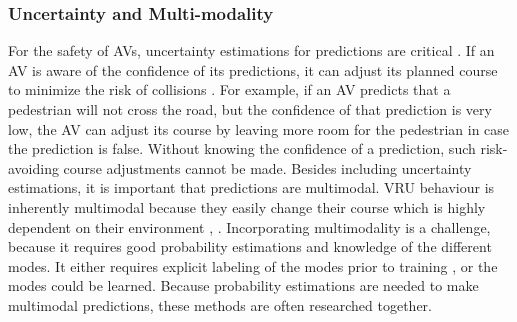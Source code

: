 \subsubsection{Uncertainty and Multi-modality}
For the safety of AVs, uncertainty estimations for predictions are critical \cite{djuric2020uncertainty}. If an AV is aware of the confidence of its predictions, it can adjust its planned course to minimize the risk of collisions \cite{huang2019uncertainty}. For example, if an AV predicts that a pedestrian will not cross the road, but the confidence of that prediction is very low, the AV can adjust its course by leaving more room for the pedestrian in case the prediction is false. Without knowing the confidence of a prediction, such risk-avoiding course adjustments cannot be made. Besides including uncertainty estimations, it is important that predictions are multimodal. VRU behaviour is inherently multimodal because they easily change their course which is highly dependent on their environment \cite{cui2019multimodal}, \cite{tang2019multiple}. Incorporating multimodality is a challenge, because it requires good probability estimations and knowledge of the different modes. It either requires explicit labeling of the modes prior to training \cite{tang2019multiple}, or the modes could be learned. Because probability estimations are needed to make multimodal predictions, these methods are often researched together. \\

